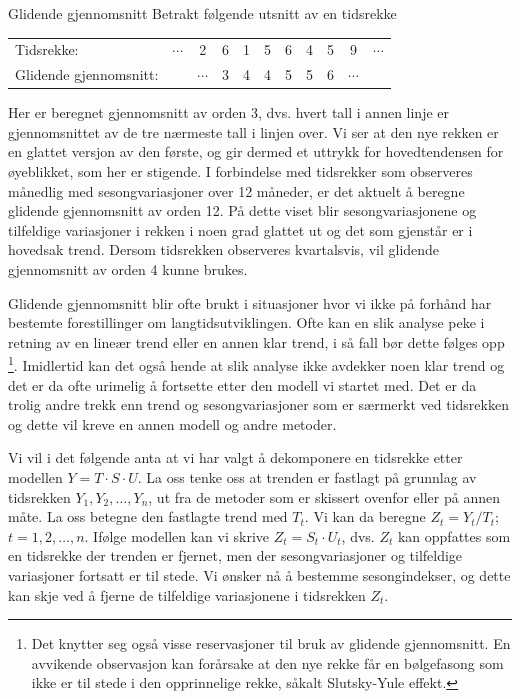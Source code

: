 \begin{eksempel}{Glidende gjennomsnitt}
Betrakt følgende utsnitt av en tidsrekke
\begin{center}
\begin{tabular}{lcccccccccc}
Tidsrekke:    & $\cdots$ & 2 & 6 & 1 & 5 & 6 & 4 & 5 & 9 & $\cdots$ \\
Glidende gjennomsnitt: & & $\cdots$ & 3 & 4 & 4 & 5 & 5 & 6 &$\cdots$ &
\end{tabular}
\end{center}
Her er beregnet gjennomsnitt av orden 3, dvs. hvert tall i annen linje er 
gjennomsnittet av de tre nærmeste tall i linjen over.  Vi ser  at den nye
rekken er en glattet versjon av den første, og gir dermed et uttrykk for
hovedtendensen for øyeblikket, som her er stigende.
I forbindelse med tids\-rekker som 
observeres månedlig med sesongvariasjoner over 12 måneder, er det
aktuelt å beregne glidende gjennomsnitt av orden 12.  På dette viset
blir sesongvariasjonene og tilfeldige variasjoner i rekken i noen grad glattet
ut og det som gjenstår er i hovedsak trend.  Dersom tidsrekken 
observeres kvartalsvis, vil glidende gjennomsnitt av orden 4 kunne brukes.
\end{eksempel}

Glidende gjennomsnitt blir ofte brukt i situasjoner hvor vi ikke på
forhånd har bestemte forestillinger om langtidsutviklingen.  Ofte kan en
slik analyse peke i retning av en lineær trend eller en annen klar trend,
i så fall bør dette følges opp \footnote{Det knytter seg også
visse reservasjoner til bruk av glidende gjennomsnitt.  En avvikende
observasjon kan forårsake at den nye rekke får en bølgefasong som
ikke er til stede i den opprinnelige rekke, såkalt Slutsky-Yule effekt.}.
Imidlertid kan det også hende at slik ana\-lyse ikke avdekker noen klar 
trend og det er da ofte urimelig å fortsette etter den modell vi startet 
med.  Det er da trolig andre trekk enn trend og sesongvariasjoner som er 
særmerkt ved tidsrekken og dette vil kreve en annen modell og andre 
metoder.

Vi vil i det følgende anta at vi har valgt å dekomponere
en tidsrekke etter modellen $Y = T \cdot S \cdot U$.  La oss tenke oss at
trenden er fastlagt på grunnlag av tidsrekken $Y_1, Y_2, \ldots, Y_n$, ut
fra de metoder som er skissert ovenfor eller på annen måte.  La oss
betegne den fastlagte trend med $T_t$.  Vi kan da beregne $Z_t = Y_t/T_t$;
$t = 1, 2, \ldots, n$.  Ifølge modellen kan vi skrive $Z_t =S_t\cdot U_t$,
 dvs. $Z_t$ kan oppfattes som en tidsrekke der trenden er fjernet, men
der sesongvariasjoner og tilfeldige variasjoner fortsatt er til stede.  Vi
ønsker nå å bestemme sesongindekser, og dette kan skje ved å
fjerne de tilfeldige variasjonene i tidsrekken $Z_t$.

